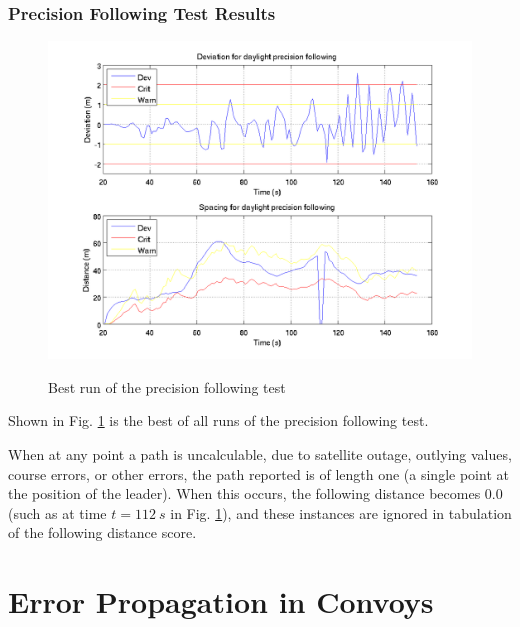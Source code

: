 \documentclass[12pt]{report}
\begin{document}
\subsection{Precision Following Test Results} \label{sec:precisionfollowingresults}

\begin{figure}[ht] \centering \label{fig:precisionresults}
    \includegraphics[width=5in]{./figs/7_4_2013__17_16_07_distance_and_deviation.png}
    \caption{Best run of the precision following test}
\end{figure}

Shown in Fig. \ref{fig:precisionresults} is the best of all runs of the precision following test. 

When at any point a path is uncalculable, due to satellite outage, outlying values, course errors, or other errors, the path reported is of length one (a single point at the position of the leader). When this occurs, the following distance becomes 0.0 (such as at time $t=112~s$ in Fig. \ref{fig:precisionresults}), and these instances are ignored in tabulation of the following distance score.





\chapter{Error Propagation in Convoys} \label{chap:errprop}
\end{document}
